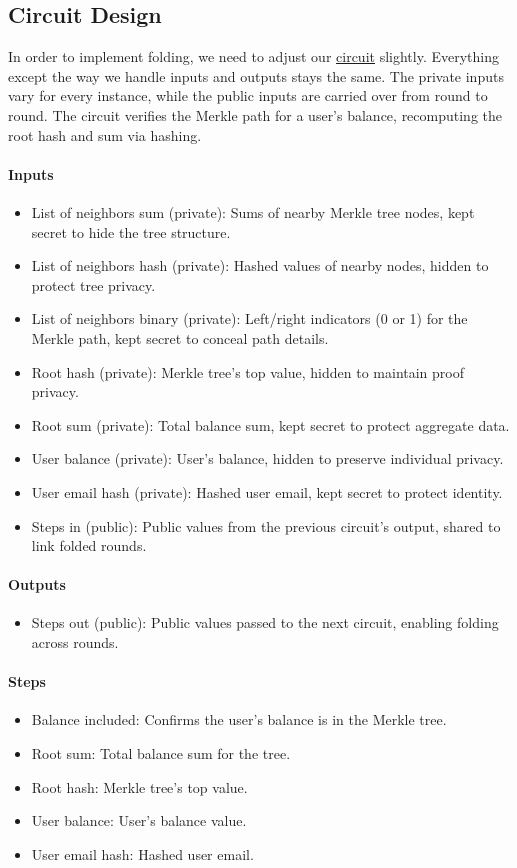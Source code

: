 \subsection{Circuit Design}
In order to implement folding, we need to adjust our \hyperref[subsec:pi]{circuit} slightly. Everything except the way we handle inputs and outputs stays the same.
The private inputs vary for every instance, while the public inputs are carried over from round to round. 
The circuit verifies the Merkle path for a user's balance, recomputing the root hash and sum via hashing.

\paragraph{Inputs}
\begin{itemize}
   \item List of neighbors sum (private): Sums of nearby Merkle tree nodes, kept secret to hide the tree structure.
   \item List of neighbors hash (private): Hashed values of nearby nodes, hidden to protect tree privacy.
   \item List of neighbors binary (private): Left/right indicators (0 or 1) for the Merkle path, kept secret to conceal path details.
   \item Root hash (private): Merkle tree's top value, hidden to maintain proof privacy.
   \item Root sum (private): Total balance sum, kept secret to protect aggregate data.
   \item User balance (private): User's balance, hidden to preserve individual privacy.
   \item User email hash (private): Hashed user email, kept secret to protect identity.
   \item Steps in (public): Public values from the previous circuit's output, shared to link folded rounds.
   \end{itemize}

\paragraph{Outputs}
\begin{itemize}
   \item Steps out (public): Public values passed to the next circuit, enabling folding across rounds.
   \end{itemize}

\paragraph{Steps}
\begin{itemize}
   \item Balance included: Confirms the user's balance is in the Merkle tree.
   \item Root sum: Total balance sum for the tree.
   \item Root hash: Merkle tree's top value.
   \item User balance: User's balance value.
   \item User email hash: Hashed user email.
   \end{itemize}


